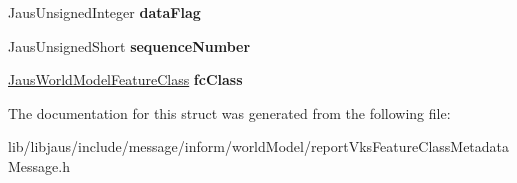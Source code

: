 \begin{DoxyCompactItemize}
\item 
\hypertarget{struct_report_vks_feature_class_metadata_message_struct_a9cbee1d34a8a2d2f3492bbafdb69ed18}{\-Jaus\-Unsigned\-Integer {\bfseries data\-Flag}}\label{struct_report_vks_feature_class_metadata_message_struct_a9cbee1d34a8a2d2f3492bbafdb69ed18}

\item 
\hypertarget{struct_report_vks_feature_class_metadata_message_struct_a3fb828202898882d95b1a3cbf6f21617}{\-Jaus\-Unsigned\-Short {\bfseries sequence\-Number}}\label{struct_report_vks_feature_class_metadata_message_struct_a3fb828202898882d95b1a3cbf6f21617}

\item 
\hypertarget{struct_report_vks_feature_class_metadata_message_struct_a731ebdc746a4c168c650c1755eefb4e6}{\hyperlink{struct_jaus_world_model_feature_class_struct}{\-Jaus\-World\-Model\-Feature\-Class} {\bfseries fc\-Class}}\label{struct_report_vks_feature_class_metadata_message_struct_a731ebdc746a4c168c650c1755eefb4e6}

\end{DoxyCompactItemize}


\-The documentation for this struct was generated from the following file\-:\begin{DoxyCompactItemize}
\item 
lib/libjaus/include/message/inform/world\-Model/report\-Vks\-Feature\-Class\-Metadata\-Message.\-h\end{DoxyCompactItemize}
